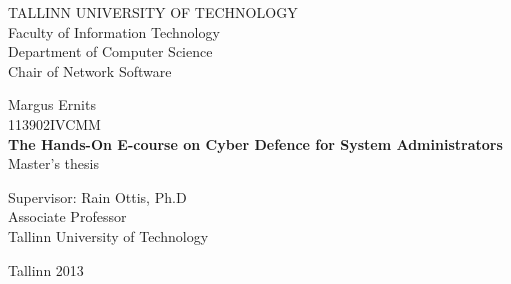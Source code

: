 \begin{titlepage}
	\begingroup
		\singlespace
		\begin{center}
			TALLINN UNIVERSITY OF TECHNOLOGY \\
			Faculty of Information Technology \\
			Department of Computer Science \\
			Chair of Network Software
		
			\vfill
				Margus Ernits \\
				113902IVCMM \\[1.5cm]
				\LARGE \textbf{The Hands-On E-course on Cyber Defence for System Administrators} \\[1cm]
				\normalsize Master's thesis \\[4cm]

				\begin{flushright}
					Supervisor: Rain Ottis, Ph.D \\
					Associate Professor \\
					Tallinn University of Technology
					
				\end{flushright}
			\vfill

			Tallinn 2013
		\end{center}
	\endgroup
\end{titlepage}